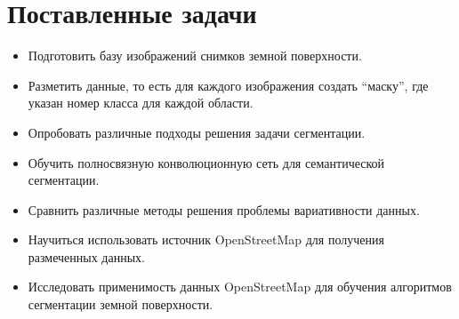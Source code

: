\section*{Поставленные задачи}
\begin{itemize}
    \item Подготовить базу изображений снимков земной поверхности.
    \item Разметить данные, то есть для каждого изображения создать ``маску'', где
        указан номер класса для каждой области.
    \item
        Опробовать различные подходы решения задачи сегментации.
    \item Обучить полносвязную конволюционную сеть для семантической
        сегментации.
    \item Сравнить различные методы решения проблемы вариативности данных.
    \item Научиться использовать источник OpenStreetMap для получения
        размеченных данных.
    \item Исследовать применимость данных OpenStreetMap для обучения алгоритмов
        сегментации земной поверхности.
\end{itemize}
